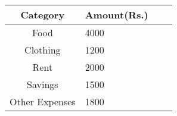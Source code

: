 \begin{center}
	\begin{tabular}{|c|l|c|l|}
		\hline
		\textbf{Category} & \textbf{Amount(Rs.)}  \\ \hline
		Food & 4000 \\ \hline
		Clothing & 1200 \\ \hline
		Rent & 2000 \\ \hline
		Savings & 1500 \\ \hline
		Other Expenses & 1800 \\ \hline
	\end{tabular}
\end{center}